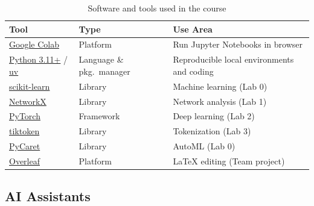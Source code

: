\documentclass[11pt,a4paper]{article}
\begin{document}
\begin{table}[htbp]
\centering
\caption{Software and tools used in the course}
\label{tab:software}
\begin{tabular}{@{}llp{6cm}@{}}
\toprule
\textbf{Tool} & \textbf{Type} & \textbf{Use Area} \\
\midrule
\href{https://colab.research.google.com}{Google Colab} & Platform & Run Jupyter Notebooks in browser \\
\href{https://www.python.org}{Python 3.11+} / \href{https://docs.astral.sh/uv/}{uv} & Language \& pkg.\ manager & Reproducible local environments and coding \\
\href{https://scikit-learn.org}{scikit-learn} & Library & Machine learning (Lab 0) \\
\href{https://networkx.org}{NetworkX} & Library & Network analysis (Lab 1) \\
\href{https://pytorch.org}{PyTorch} & Framework & Deep learning (Lab 2) \\
\href{https://github.com/openai/tiktoken}{tiktoken} & Library & Tokenization (Lab 3) \\
\href{https://www.pycaret.org}{PyCaret} & Library & AutoML (Lab 0) \\
\href{https://www.overleaf.com}{Overleaf} & Platform & LaTeX editing (Team project) \\
\bottomrule
\end{tabular}
\end{table}

\subsection{AI Assistants}
\end{document}
